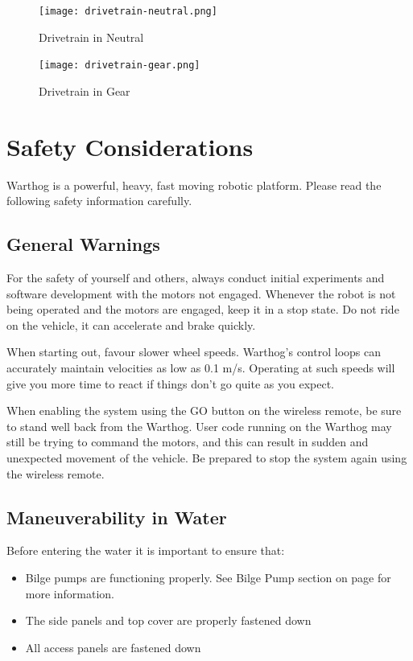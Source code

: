 \documentclass[]{clearpath-latex/clearpath-manual}
\begin{document}
\begin{figure}[!htb]
  \centering
  \texttt{[image: drivetrain-neutral.png]}
  \caption{Drivetrain in Neutral}
  \label{drivetrain-n}
\end{figure}


\begin{figure}[!t]
  \centering
  \texttt{[image: drivetrain-gear.png]}
  \caption{Drivetrain in Gear}
  \label{drivetrain-g}
\end{figure}


\section{Safety Considerations}

Warthog is a powerful, heavy, fast moving robotic platform. Please read the following safety information carefully.

\subsection{General Warnings}

For the safety of yourself and others, always conduct initial experiments and software development with the motors not engaged.  Whenever the robot is not being operated and the motors are engaged, keep it in a stop state.  Do not ride on the vehicle, it can accelerate and brake quickly.

When starting out, favour slower wheel speeds. Warthog's control loops can accurately maintain velocities as low as 0.1 m/s. Operating at such speeds will give you more time to react if things don’t go quite as you expect.

When enabling the system using the GO button on the wireless remote, be sure to stand well back from the Warthog. User code running on the Warthog may still be trying to command the motors, and this can result in sudden and unexpected movement of the vehicle. Be prepared to stop the system again using the wireless remote.


\subsection{Maneuverability in Water}

Before entering the water it is important to ensure that:

\begin{itemize}[nolistsep]
  \item Bilge pumps are functioning properly.  See Bilge Pump section on page \pageref{bilgepumps} for more information.
  \item The side panels and top cover are properly fastened down
  \item All access panels are fastened down
\end{itemize}
\end{document}
